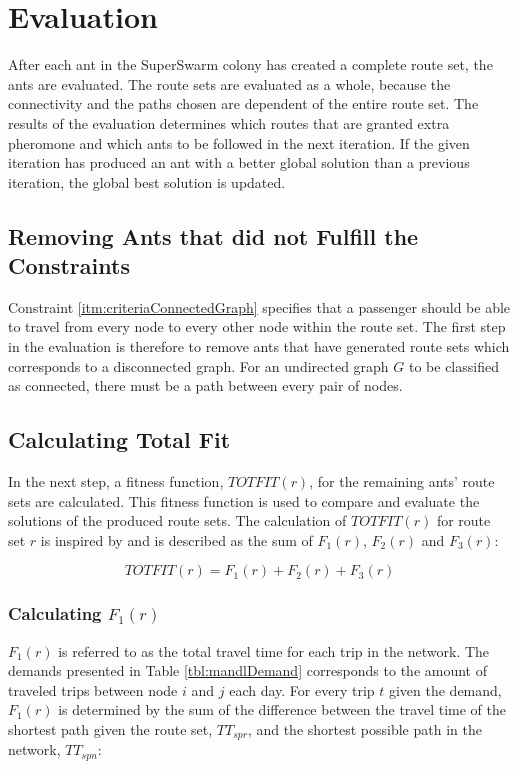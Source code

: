 \section{Evaluation}
\label{sec:algoEvaluation}
After each ant in the SuperSwarm colony has created a complete route set, the ants are evaluated. The route sets are evaluated as a whole, because the connectivity and the paths chosen are dependent of the entire route set. The results of the evaluation determines which routes that are granted extra pheromone and which ants to be followed in the next iteration. If the given iteration has produced an ant with a better global solution than a previous iteration, the global best solution is updated.

\subsection{Removing Ants that did not Fulfill the Constraints}
\label{sec:algoRemoval}
Constraint \vref{itm:criteriaConnectedGraph} specifies that a passenger should be able to travel from every node to every other node within the route set. The first step in the evaluation is therefore to remove ants that have generated route sets which corresponds to a disconnected graph. For an undirected graph $G$ to be classified as connected, there must be a path between every pair of nodes. 

\subsection{Calculating Total Fit}
\label{sec:totfit}
In the next step, a fitness function, $TOTFIT(r)$, for the remaining ants' route sets are calculated. This fitness function is used to compare and evaluate the solutions of the produced route sets. The calculation of $TOTFIT(r)$ for route set $r$ is inspired by \citet{kechagiopoulos14} and is described as the sum of $F_{1}(r)$, $F_{2}(r)$ and $F_{3}(r)$: 

$$ TOTFIT(r) = F_{1}(r) + F_{2}(r) + F_{3}(r)$$

\subsubsection{Calculating $F_{1}(r)$}
\label{sec:f1}
$F_{1}(r)$ is referred to as the total travel time for each trip in the network. The demands presented in Table \vref{tbl:mandlDemand} corresponds to the amount of traveled trips between node $i$ and $j$ each day. For every trip $t$ given the demand, $F_{1}(r)$ is determined by the sum of the difference between the travel time of the shortest path given the route set, $TT_{spr}$, and the shortest possible path in the network, $TT_{spn}$:

